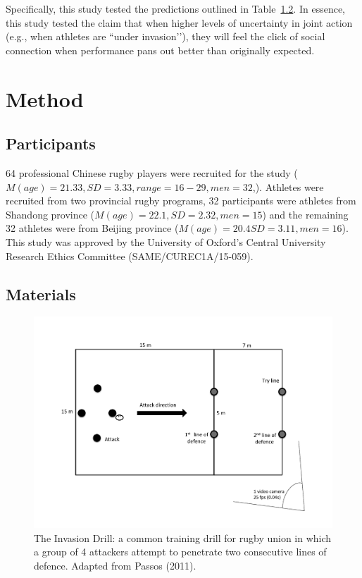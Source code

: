 \begin{CJK}{UTF8}{gbsn}
Specifically, this study tested the predictions outlined in Table~\ref{}.  In essence, this study tested the claim that when higher levels of uncertainty in joint action (e.g., when athletes are ``under invasion’’), they will feel the click of social connection when performance pans out better than originally expected.







\clearpage
\section{Method}

\subsection{Participants}
64 professional Chinese rugby players were recruited for the study ($M(age) = 21.33, SD = 3.33, range = 16-29, men = 32$,).  Athletes were recruited from two provincial rugby programs, 32
participants were athletes from Shandong province ($M(age) = 22.1, SD = 2.32, men = 15$) and the remaining 32 athletes were from Beijing province ($M(age) = 20.4 SD = 3.11, men = 16$).  This study was approved by the University of Oxford's Central University Research Ethics Committee (SAME/CUREC1A/15-059).


\subsection{Materials}


\begin{figure}[htbp]
  \centering
      \includegraphics[width=0.9\linewidth,keepaspectratio] {images/invasionDrill}
      \caption{The Invasion Drill: a common training drill for rugby union in which a group of 4 attackers attempt to penetrate two consecutive lines of defence. Adapted from Passos (2011).}
      \label{fig:invasionDrill}
  \end{figure}



\end{CJK}
